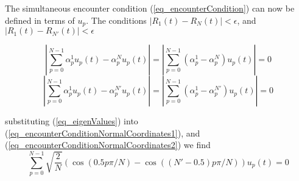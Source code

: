 \documentclass{report}
\begin{document}
The simultaneous encounter condition (\ref{eq_encounterCondition}) can now be defined in terms of $u_p$. The conditions $|R_1(t)-R_N(t)|<\epsilon$, and  $|R_1(t)-R_{N'}(t)|<\epsilon$

\begin{equation}\label{eq_encounterConditionNormalCoordinates1}
|\sum_{p=0}^{N-1}\alpha_p^1 u_p(t)-\alpha_p^Nu_p(t)|=|\sum_{p=0}^{N-1}(\alpha_p^1-\alpha_p^N)u_p(t)|=0
\end{equation}
\begin{equation}\label{eq_encounterConditionNormalCoordinates2}
|\sum_{p=0}^{N-1}\alpha_p^1 u_p(t)-\alpha_p^{N'}u_p(t)| =|\sum_{p=0}^{N-1}(\alpha_p^1-\alpha_p^{N'})u_p(t)|=0
\end{equation}

substituting (\ref{eq_eigenValues}) into (\ref{eq_encounterConditionNormalCoordinates1}), and (\ref{eq_encounterConditionNormalCoordinates2}) we find 
\begin{equation}
\sum_{p=0}^{N-1}\sqrt{\frac{2}{N}}(\cos(0.5p\pi /N)-\cos((N'-0.5)p\pi /N))u_p(t) = 0
\end{equation}
\end{document}
